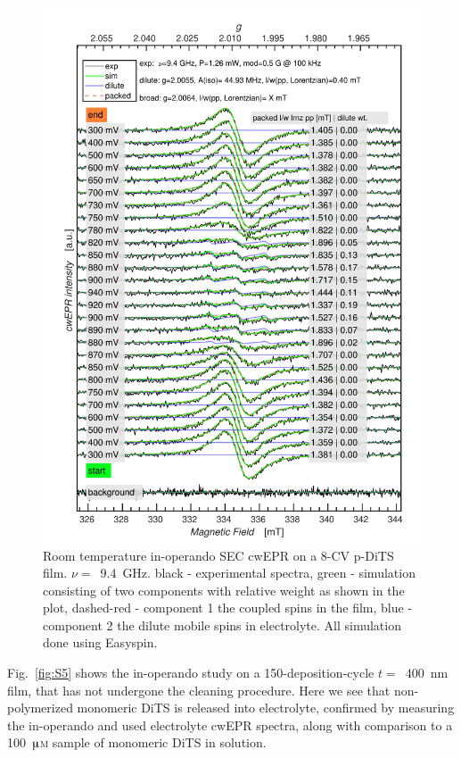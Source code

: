 \begin{figure}[h!]
\centering
\includegraphics[width=1\textwidth]{./operando_epr/figures/Figure_S4}
\caption{Room temperature in-operando SEC cwEPR on a 8-CV p-DiTS film. $\nu=$~9.4~GHz. black - experimental spectra, green - simulation consisting of two components with relative weight as shown in the plot, dashed-red - component 1 the coupled spins in the film, blue - component 2 the dilute mobile spins in electrolyte. All simulation done using Easyspin.\cite{Stoll2006}}
\label{fig:S4}
\end{figure}


Fig.~\ref{fig:S5} shows the in-operando study on a 150-deposition-cycle $t =$~400~nm film, that has not undergone the cleaning procedure. Here we see that non-polymerized monomeric DiTS is released into electrolyte, confirmed by measuring the in-operando and used electrolyte cwEPR spectra, along with comparison to a 100~$\muup$\textsc{m} sample of monomeric DiTS in solution.




